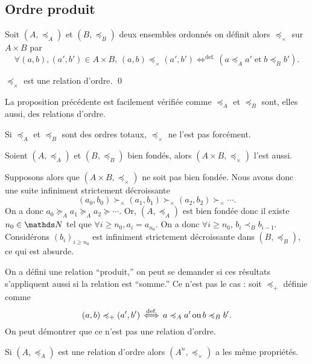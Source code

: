 \subsection{Ordre produit}

\begin{defn}
	Soit $(A, \preceq_A)$\/ et $(B, \preceq_B)$\/ deux ensembles ordonnés on définit alors $\preceq_\times$\/ sur $A\times B$\/ par \[
		\forall (a,b), (a', b') \in A \times B,\,(a,b) \preceq_\times (a',b') \mathop{\iff}^{\text{def.}}(a \preceq_A a' \mathop{\text{et}} b \preceq_B b')
	.\]
\end{defn}

\begin{prop}
	$\preceq_\times$\/ est une relation d'ordre. \qed
\end{prop}

La proposition précédente est facilement vérifiée comme $\preceq_A$\/ et $\preceq_B$\/ sont, elles aussi, des relations d'ordre.

\begin{rmk}[\danger\!\!]
	Si $\preceq_A$\/ et $\preceq_B$\/ sont des ordres totaux, $\preceq_\times$\/ ne l'est pas forcément.
\end{rmk}

\begin{prop}
	Soient $(A, \preceq_A)$\/ et $(B, \preceq_B)$\/ bien fondés, alors $(A\times B, \preceq_\times)$ l'est aussi.
\end{prop}

\begin{prv}
	Supposons alors que $(A \times B, \preceq_\times)$\/ ne soit pas bien fondée.
	Nous avons donc une suite infiniment strictement décroissante \[
		(a_0,b_0) \succ_\times (a_1, b_1) \succ_\times (a_2, b_2)\succ_\times \cdots
	.\]
	On a donc $a_0 \succeq_A a_1 \succeq_A a_2 \succeq \cdots$. Or, $(A, \preceq_A)$\/ est bien fondée donc il existe $n_0 \in \N$\/ tel que $\forall i \ge n_0, a_i = a_{n_0}$. On a donc $\forall i \ge n_0,\, b_i \prec_B b_{i-1}$.
	Considérons $(b_i)_{i \ge n_0}$\/ est infiniment strictement décroissante dans $(B, \preceq_B)$, ce qui est absurde.
\end{prv}

\begin{rmk}
	On a défini une relation ``produit,'' on peut se demander si ces résultats s'appliquent aussi si la relation est ``somme.'' Ce n'est pas le cas : soit $\preceq_+$\/ définie comme \[
		(a, b) \preccurlyeq_+ (a', b') \mathop{\iff}^{\text{def.}} a \preccurlyeq_A a' \mathop{\text{ou}} b \preccurlyeq_B b'
	.\] On peut démontrer que ce n'est pas une relation d'ordre.
\end{rmk}

\begin{rmk}
	Si $(A, \preceq_A)$\/ est une relation d'ordre alors $(A^n, \preceq_\times)$\/ a les même propriétés.
\end{rmk}
